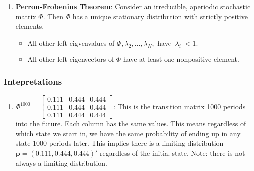 \documentclass{article}
\begin{document}
\begin{itemize}
\begin{enumerate}
    \item \textbf{Perron-Frobenius Theorem}: Consider an irreducible, aperiodic
    stochastic matrix $ \Phi $. Then $ \Phi $ has a unique stationary 
    distribution with strictly positive elements.
    \begin{itemize}
        \item All other left eigvenvalues of $ \Phi, \lambda_2, \dots, 
        \lambda_N, $ have $ |\lambda_i| < 1 $.
        \item All other left eigenvectors of $ \Phi $ have at least one 
        nonpositive element. 
    \end{itemize}
    \end{enumerate}
\end{itemize}
\subsubsection{Intepretations}
\begin{enumerate}
    \item $ \Phi^{1000} = \begin{bmatrix}
        0.111 & 0.444 & 0.444 \\
        0.111 & 0.444 & 0.444 \\
        0.111 & 0.444 & 0.444
        \end{bmatrix} $: This is the transition matrix 1000 periods into the 
        future. Each column has the same values. This means regardless of which
        state we start in, we have the same probability of ending up in any
        state 1000 periods later. This implies there is a limiting distribution 
        $ \textbf{p} = (0.111, 0.444, 0.444)' $ regardless of the initial state. 
        Note: there is not always a limiting distribution. 
\end{enumerate}
\end{document}
